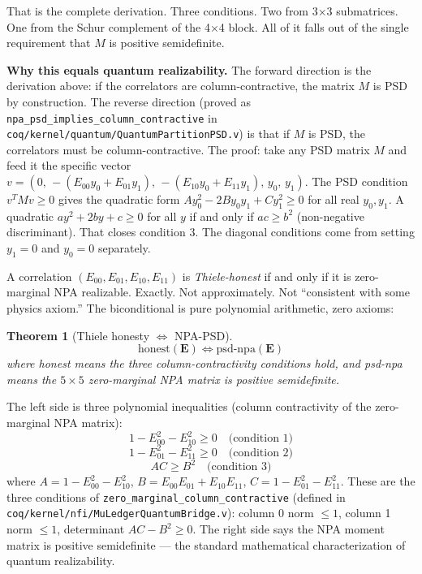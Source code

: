 \documentclass[11pt,a4paper]{article}
\theoremstyle{plain}
\newtheorem{theorem}{Theorem}[section]
\theoremstyle{definition}
\theoremstyle{remark}
\begin{document}
That is the complete derivation. Three conditions. Two from 3×3 submatrices. One from the Schur complement of the 4×4 block. All of it falls out of the single requirement that $M$ is positive semidefinite.

\medskip
\noindent\textbf{Why this equals quantum realizability.}
The forward direction is the derivation above: if the correlators are column-contractive, the matrix $M$ is PSD by construction. The reverse direction (proved as \texttt{npa\_psd\_implies\_column\_contractive} in \texttt{coq/kernel/quantum/QuantumPartitionPSD.v}) is that if $M$ is PSD, the correlators must be column-contractive. The proof: take any PSD matrix $M$ and feed it the specific vector $v = (0,\, -(E_{00}y_0 + E_{01}y_1),\, -(E_{10}y_0 + E_{11}y_1),\, y_0,\, y_1)$. The PSD condition $v^T M v \geq 0$ gives the quadratic form $Ay_0^2 - 2By_0y_1 + Cy_1^2 \geq 0$ for all real $y_0, y_1$. A quadratic $ay^2 + 2by + c \geq 0$ for all $y$ if and only if $ac \geq b^2$ (non-negative discriminant). That closes condition 3. The diagonal conditions come from setting $y_1 = 0$ and $y_0 = 0$ separately.

A correlation $(E_{00}, E_{01}, E_{10}, E_{11})$ is \emph{Thiele-honest} if and only if it is zero-marginal NPA realizable. Exactly. Not approximately. Not ``consistent with some physics axiom.'' The biconditional is pure polynomial arithmetic, zero axioms:

\begin{theorem}[Thiele honesty $\iff$ NPA-PSD]
\[
\text{honest}(\mathbf{E}) \iff \text{psd-npa}(\mathbf{E})
\]
where \emph{honest} means the three column-contractivity conditions hold, and \emph{psd-npa} means the $5\times5$ zero-marginal NPA matrix is positive semidefinite.
\end{theorem}

The left side is three polynomial inequalities (column contractivity of the zero-marginal NPA matrix):
\[
1 - E_{00}^2 - E_{10}^2 \geq 0 \quad \text{(condition 1)}
\]
\[
1 - E_{01}^2 - E_{11}^2 \geq 0 \quad \text{(condition 2)}
\]
\[
AC \geq B^2 \quad \text{(condition 3)}
\]
where $A = 1-E_{00}^2-E_{10}^2$, $B = E_{00}E_{01}+E_{10}E_{11}$, $C = 1-E_{01}^2-E_{11}^2$.
These are the three conditions of \texttt{zero\_marginal\_column\_contractive} (defined in \texttt{coq/kernel/nfi/MuLedgerQuantumBridge.v}): column 0 norm $\leq 1$, column 1 norm $\leq 1$, determinant $AC - B^2 \geq 0$.
The right side says the NPA moment matrix is positive semidefinite --- the standard mathematical characterization of quantum realizability.
\end{document}
